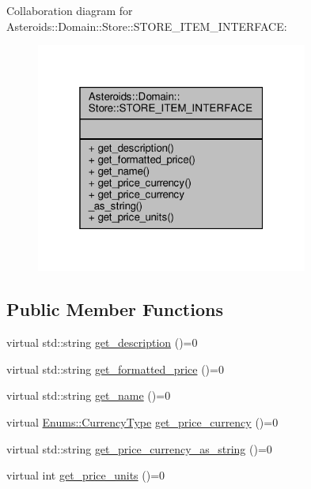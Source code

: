 Collaboration diagram for Asteroids\+:\+:Domain\+:\+:Store\+:\+:S\+T\+O\+R\+E\+\_\+\+I\+T\+E\+M\+\_\+\+I\+N\+T\+E\+R\+F\+A\+CE\+:\nopagebreak
\begin{figure}[H]
\begin{center}
\leavevmode
\includegraphics[width=253pt]{classAsteroids_1_1Domain_1_1Store_1_1STORE__ITEM__INTERFACE__coll__graph}
\end{center}
\end{figure}
\subsection*{Public Member Functions}
\begin{DoxyCompactItemize}
\item 
virtual std\+::string \hyperlink{classAsteroids_1_1Domain_1_1Store_1_1STORE__ITEM__INTERFACE_a75aeeea1b67c334516b4c385ab2d816d}{get\+\_\+description} ()=0
\item 
virtual std\+::string \hyperlink{classAsteroids_1_1Domain_1_1Store_1_1STORE__ITEM__INTERFACE_acde01f5da09e656994cd6b76e1f5a625}{get\+\_\+formatted\+\_\+price} ()=0
\item 
virtual std\+::string \hyperlink{classAsteroids_1_1Domain_1_1Store_1_1STORE__ITEM__INTERFACE_ac3d8f396c58c25522961a1f606ef5bae}{get\+\_\+name} ()=0
\item 
virtual \hyperlink{namespaceAsteroids_1_1Domain_1_1Store_1_1Enums_a995d66dbd6bc566c0765fdcfd7be6006}{Enums\+::\+Currency\+Type} \hyperlink{classAsteroids_1_1Domain_1_1Store_1_1STORE__ITEM__INTERFACE_abe2b040ee1d6676d604123e1ea102e09}{get\+\_\+price\+\_\+currency} ()=0
\item 
virtual std\+::string \hyperlink{classAsteroids_1_1Domain_1_1Store_1_1STORE__ITEM__INTERFACE_a914d5fb19a801e397953180f6b115e04}{get\+\_\+price\+\_\+currency\+\_\+as\+\_\+string} ()=0
\item 
virtual int \hyperlink{classAsteroids_1_1Domain_1_1Store_1_1STORE__ITEM__INTERFACE_ae9fbf8488c53bbf068980d97866ec269}{get\+\_\+price\+\_\+units} ()=0
\end{DoxyCompactItemize}


